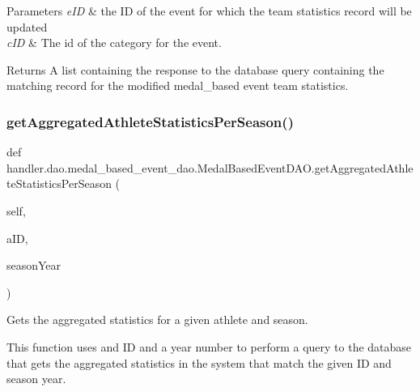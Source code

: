 \begin{DoxyParams}{Parameters}
{\em e\+ID} & the ID of the event for which the team statistics record will be updated \\
\hline
{\em c\+ID} & The id of the category for the event.\\
\hline
\end{DoxyParams}
\begin{DoxyReturn}{Returns}
A list containing the response to the database query containing the matching record for the modified medal\+\_\+based event team statistics. 
\end{DoxyReturn}
\mbox{\label{classhandler_1_1dao_1_1medal__based__event__dao_1_1_medal_based_event_d_a_o_a3bb2f707a290025e37940e7731dba418}} 
\subsubsection{\texorpdfstring{get\+Aggregated\+Athlete\+Statistics\+Per\+Season()}{getAggregatedAthleteStatisticsPerSeason()}}
{\footnotesize\ttfamily def handler.\+dao.\+medal\+\_\+based\+\_\+event\+\_\+dao.\+Medal\+Based\+Event\+D\+A\+O.\+get\+Aggregated\+Athlete\+Statistics\+Per\+Season (\begin{DoxyParamCaption}\item[{}]{self,  }\item[{}]{a\+ID,  }\item[{}]{season\+Year }\end{DoxyParamCaption})}



Gets the aggregated statistics for a given athlete and season. 

This function uses and ID and a year number to perform a query to the database that gets the aggregated statistics in the system that match the given ID and season year.


